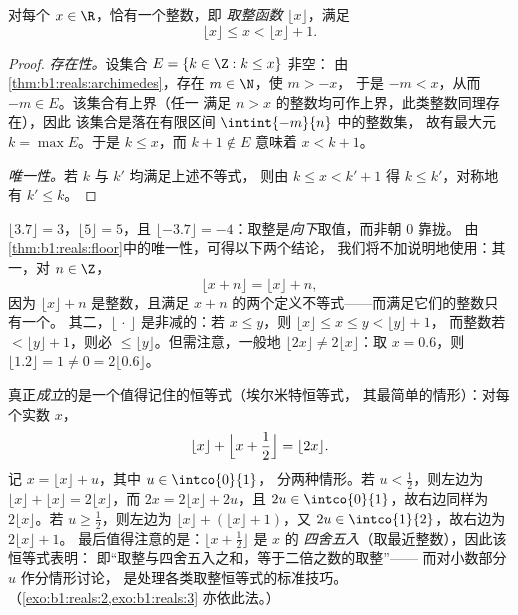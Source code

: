 \begin{theorem}[取整函数]\label{thm:b1:reals:floor}
对每个 $x \in \R$，恰有一个整数，即
\emph{取整函数} $\lfloor x \rfloor$，满足
\[
\lfloor x \rfloor \leq x < \lfloor x \rfloor + 1 .
\]
\end{theorem}

\begin{proof}
\emph{存在性。}设集合 $E = \{k \in \Z : k \leq x\}$ 非空：
由\cref{thm:b1:reals:archimedes}，存在 $m \in \N$，使 $m > -x$，
于是 $-m < x$，从而 $-m \in E$。该集合有上界（任一
满足 $n > x$ 的整数均可作上界，此类整数同理存在），因此
该集合是落在有限区间 $\intint{-m}{n}$ 中的整数集，
故有最大元 $k = \max E$。于是 $k \leq x$，而 $k + 1 \notin E$
意味着 $x < k + 1$。

\emph{唯一性。}若 $k$ 与 $k'$ 均满足上述不等式，
则由 $k \leq x < k' + 1$ 得 $k \leq k'$，对称地有 $k'
\leq k$。
\end{proof}

\begin{example}[取整函数的应用]\label{ex:b1:reals:floorpractice}
$\lfloor 3.7 \rfloor = 3$，$\lfloor 5 \rfloor = 5$，且 $\lfloor
-3.7 \rfloor = -4$：取整是\emph{向下}取值，而非朝 $0$ 靠拢。
由\cref{thm:b1:reals:floor}中的唯一性，可得以下两个结论，
我们将不加说明地使用：其一，对 $n \in \Z$，
\[
\lfloor x + n \rfloor = \lfloor x \rfloor + n ,
\]
因为 $\lfloor x \rfloor + n$ 是整数，且满足
$x + n$ 的两个定义不等式——而满足它们的整数只有一个。
其二，$\lfloor \, \cdot \, \rfloor$ 是非减的：若 $x \leq
y$，则 $\lfloor x \rfloor \leq x \leq y < \lfloor y \rfloor + 1$，
而整数若 $< \lfloor y \rfloor + 1$，则必 $\leq \lfloor y
\rfloor$。但需注意，一般地 $\lfloor 2x \rfloor \neq 2\lfloor
x \rfloor$：取 $x = 0.6$，则 $\lfloor 1.2 \rfloor = 1
\neq 0 = 2\lfloor 0.6 \rfloor$。

真正\emph{成立}的是一个值得记住的恒等式（埃尔米特恒等式，
其最简单的情形）：对每个实数 $x$，
\[
\lfloor x \rfloor + \Bigl\lfloor x + \frac12 \Bigr\rfloor
= \lfloor 2x \rfloor .
\]
记 $x = \lfloor x\rfloor + u$，其中 $u \in \intco{0}{1}$，
分两种情形。若 $u < \frac12$，则左边为 $\lfloor
x\rfloor + \lfloor x\rfloor = 2\lfloor x\rfloor$，而 $2x =
2\lfloor x\rfloor + 2u$，且 $2u \in \intco{0}{1}$，故右边同样为
$2\lfloor x\rfloor$。若 $u \geq \frac12$，则左边为
$\lfloor x\rfloor + (\lfloor x\rfloor + 1)$，又 $2u \in
\intco{1}{2}$，故右边为 $2\lfloor x\rfloor + 1$。
最后值得注意的是：$\lfloor x + \frac12\rfloor$ 是 $x$ 的
\emph{四舍五入}（取最近整数），因此该恒等式表明：
即“取整与四舍五入之和，等于二倍之数的取整”——
而对小数部分 $u$ 作分情形讨论，
是处理各类取整恒等式的标准技巧。
（\cref{exo:b1:reals:2,exo:b1:reals:3} 亦依此法。）
\end{example}

